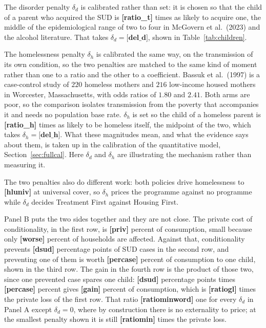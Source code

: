 \documentclass[10pt]{article}
\begin{document}
The disorder penalty $\delta_d$ is calibrated rather than set: it is chosen so that
the child of a parent who acquired the SUD is \textbf{[ratio_t]} times as likely to acquire
one, the middle of the epidemiological range of two to four in McGovern et al.\
(2023) and the alcohol literature. That takes $\delta_d = \textbf{[del_d]}$, shown in
Table~\ref{tab:children}.

The homelessness penalty $\delta_h$ is calibrated the same way, on the transmission of
its own condition, so the two penalties are matched to the same kind of moment rather
than one to a ratio and the other to a coefficient. Bassuk et al.\ (1997) is a case-control study of $220$ homeless mothers and $216$ low-income housed mothers in
Worcester, Massachusetts, with odds
ratios of $1.80$ and $2.41$. Both arms are poor, so the comparison isolates
transmission from the poverty that accompanies it and needs no population base rate.
$\delta_h$ is set so the child of a homeless parent is \textbf{[ratio_h]} times as likely to
be homeless itself, the midpoint of the two, which takes $\delta_h = \textbf{[del_h]}$.
What these magnitudes mean, and what the evidence says about them, is taken up in the
calibration of the quantitative model, Section~\ref{sec:fullcal}. Here $\delta_d$ and
$\delta_h$ are illustrating the mechanism rather than measuring it.

The two penalties also do different work: both policies drive
homelessness to \textbf{[hluniv]} at universal cover, so $\delta_h$ prices the programme
against no programme while $\delta_d$ decides Treatment First against Housing
First.


Panel B puts the two sides together and they are not close. The private cost of
conditionality, in the first row, is \textbf{[priv]} percent of consumption, small
because only \textbf{[worse]} percent of households are affected. Against that,
conditionality prevents \textbf{[dsud]} percentage points of SUD cases in the
second row, and preventing one of them is worth \textbf{[percase]} percent
of consumption to one child, shown in the third row. The gain in the fourth row is the
product of those two, since one prevented case spares one child: \textbf{[dsud]}
percentage points times \textbf{[percase]} percent gives \textbf{[gain]} percent of
consumption, which is \textbf{[ratiogl]} times the private loss of the first row.
That ratio \textbf{[ratiominword]} one for every $\delta_d$ in Panel A except $\delta_d=0$, where
by construction there is no externality to price; at the smallest penalty shown it is
still \textbf{[ratiomin]} times the private loss. 
\end{document}
